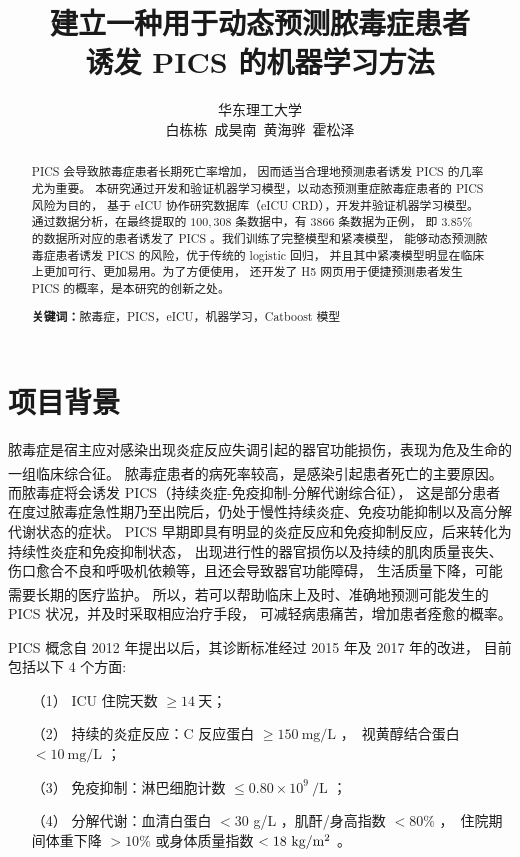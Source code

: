\documentclass[12pt,titlepage]{article}
\title{建立一种用于动态预测脓毒症患者\\诱发 PICS 的机器学习方法}
\author{%
华东理工大学\\
白栋栋\ 成昊南\ 黄海骅\ 霍松泽%
}
\date{}
\begin{document}
\maketitle


\begin{abstract}
    \hspace{\parindent}PICS 会导致脓毒症患者长期死亡率增加，%
    因而适当合理地预测患者诱发 PICS 的几率尤为重要。%
    本研究通过开发和验证机器学习模型，以动态预测重症脓毒症患者的 PICS 风险为目的，%
    基于 eICU 协作研究数据库\nobreak（eICU CRD），开发并验证机器学习模型。%
    通过数据分析，在最终提取的 $100,308$ 条数据中，有 $3866$ 条数据为正例，%
    即 $3.85\%$ 的数据所对应的患者诱发了 PICS 。我们训练了完整模型和紧凑模型，%
    能够动态预测脓毒症患者诱发 PICS 的风险，优于传统的 logistic 回归，%
    并且其中紧凑模型明显在临床上更加可行、更加易用。为了方便使用，%
    还开发了 H5 网页用于便捷预测患者发生 PICS 的概率，是本研究的创新之处。

    \noindent\textbf{关键词：}脓毒症，PICS，eICU，机器学习，Catboost 模型
\end{abstract}


\tableofcontents
\newpage


\section{项目背景}

脓毒症是宿主应对感染出现炎症反应失调引起的器官功能损伤，表现为危及生命的一组临床综合征。%
脓毒症患者的病死率较高，是感染引起患者死亡的主要原因\textsuperscript{\cite{sepsis}}。%
而脓毒症将会诱发 PICS（持续炎症-免疫抑制-分解代谢综合征），%
这是部分患者在度过脓毒症急性期乃至出院后，仍处于慢性持续炎症、免疫功能抑制以及高分解代谢状态的症状。%
PICS 早期即具有明显的炎症反应和免疫抑制反应，后来转化为持续性炎症和免疫抑制状态，%
出现进行性的器官损伤以及持续的肌肉质量丧失、伤口愈合不良和呼吸机依赖等，且还会导致器官功能障碍，%
生活质量下降，可能需要长期的医疗监护\textsuperscript{\cite{pics}}。%
所以，若可以帮助临床上及时、准确地预测可能发生的 PICS 状况，并及时采取相应治疗手段，%
可减轻病患痛苦，增加患者痊愈的概率。

PICS 概念自 2012 年提出以后，其诊断标准经过 2015 年及 2017 年的改进，%
目前包括以下 $4$ 个方面:

\begin{enumerate}
    \item[（1）] ICU 住院天数 $\ge 14~\text{天}$；
    \item[（2）] 持续的炎症反应：C 反应蛋白 $\ge 150~\text{mg/L}$ ，\
        视黄醇结合蛋白 $< 10~\text{mg/L}$ ；
    \item[（3）] 免疫抑制：淋巴细胞计数 $\le 0.80 \times 10^{9}~\text{/L}$ ；
    \item[（4）] 分解代谢：血清白蛋白 $< 30$ g/L ，肌酐/身高指数 $< 80\%$ ，\
        住院期间体重下降 $ > 10\%$ 或身体质量指数 $< 18~\text{kg/m\textsuperscript{2}}$ 。
\end{enumerate}
\end{document}
